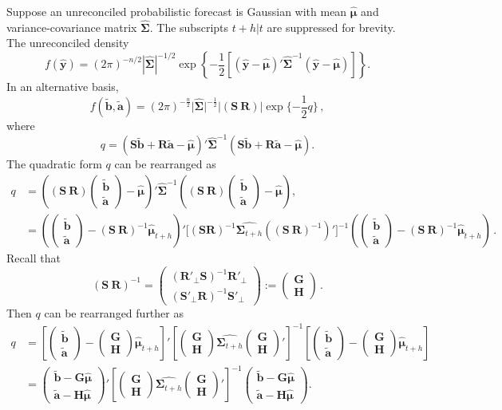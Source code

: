 \documentclass[a4paper, 11pt]{article}
\def\PQ{\begin{pmatrix}\bm{G}\\[-0.2cm]\bm{H}\end{pmatrix}}
\def\bt{\begin{pmatrix}\tilde{\bm{b}}\\[-0.2cm]\tilde{\bm{a}}\end{pmatrix}}
\theoremstyle{definition}
\begin{document}
Suppose an unreconciled probabilistic forecast is Gaussian with mean $\hat{\bm{\mu}}$ and variance-covariance matrix $\hat{\bm{\Sigma}}$. The subscripts $t+h|t$ are suppressed for brevity. The unreconciled density
\begin{equation}
  f(\hat{\bm{y}})=(2\pi)^{-n/2}|\hat{\bm{\Sigma}}|^{-1/2}\exp\left\{-\frac{1}{2}\left[(\hat{\bm{y}}-\hat{\bm{\mu}})'\hat{\bm{\Sigma}}^{-1}(\hat{\bm{y}}-\hat{\bm{\mu}})\right]\right\}.
\end{equation}
In an alternative basis,
\begin{equation}
f(\tilde{\bm{b}},\tilde{\bm{a}})=(2\pi)^{-\frac{n}{2}}\Big|\hat{\bm{\Sigma}}\Big|^{-\frac{1}{2}}\Big|(\bm{S} ~  \bm{R})\Big|\exp\{-\frac{1}{2}q\}\,,
\end{equation}
where
\begin{equation}
q=(\bm{S}\tilde{\bm{b}}+\bm{R}\tilde{\bm{a}}-\hat{\bm{\mu}})' \hat{\bm{\Sigma}}^{-1}(\bm{S}\tilde{\bm{b}}+\bm{R}\tilde{\bm{a}}-\hat{\bm{\mu}}).
\end{equation}
The quadratic form $q$ can be rearranged as
\begin{align*}
q& =
\left((\bm{S} ~  \bm{R})\bt-\hat{\bm{\mu}}\right)' \hat{\bm{\Sigma}}^{-1}\left((\bm{S} ~ \bm{R})\bt-\hat{\bm{\mu}}\right),\\
& =
\left(\bt-(\bm{S} ~ \bm{R})^{-1}\hat{\bm{\mu}}_{t+h}\right)' \Big[(\bm{S}  \bm{R})^{-1}\hat{\bm{\Sigma}_{t+h}}\left((\bm{S} ~ \bm{R})^{-1}\right)'\Big]^{-1}
\left(\bt-(\bm{S} ~ \bm{R})^{-1}\hat{\bm{\mu}}_{t+h}\right)\,.
\end{align*}
Recall that
\[
  (\bm{S} ~ \bm{R})^{-1} =
  \begin{pmatrix}(\bm{R}'_\bot \bm{S})^{-1}\bm{R}'_\bot  \\ (\bm{S}'_\bot \bm{R})^{-1}\bm{S}'_\bot \end{pmatrix} :=
  \begin{pmatrix}
  \bm{G} \\\bm{H}
  \end{pmatrix}\,.
\]
Then $q$ can be rearranged further as
\begin{align*}
q& =%
\left[\bt-\PQ\hat{\bm{\mu}}_{t+h}\right]'%
\left[\PQ\hat{\bm{\Sigma}_{t+h}}\PQ'\right]^{-1}\left[\bt-\PQ\hat{\bm{\mu}}_{t+h}\right] %
\\[0.5cm]
 & =%
\begin{pmatrix}\tilde{\bm{b}} - \bm{G}\hat{\bm{\mu}}\\ \tilde{\bm{a}}- \bm{H}\hat{\bm{\mu}}\end{pmatrix}' %
 \left[\PQ\hat{\bm{\Sigma}_{t+h}}\PQ'\right]^{-1}\begin{pmatrix}\tilde{\bm{b}} - \bm{G}\hat{\bm{\mu}}\\ \tilde{\bm{a}}- \bm{H}\hat{\bm{\mu}}\end{pmatrix}. %
\end{align*}
\end{document}
